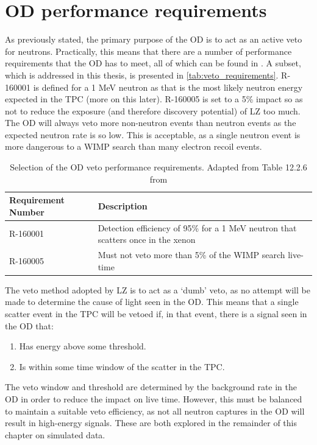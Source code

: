 \section{OD performance requirements}
\label{sec:simulated_od_requirements}
\par
As previously stated, the primary purpose of the OD is to act as an active veto for neutrons.
Practically, this means that there are a number of performance requirements that the OD has to meet, all of which can be found in \cite{LZ_TechnicalDesignReview_ref}.
A subset, which is addressed in this thesis, is presented in \autoref{tab:veto_requirements}.
R-160001 is defined for a 1 MeV neutron as that is the most likely neutron energy expected in the TPC (more on this later).
R-160005 is set to a 5\% impact so as not to reduce the exposure (and therefore discovery potential) of LZ too much.
The OD will always veto more non-neutron events than neutron events as the expected neutron rate is so low.
This is acceptable, as a single neutron event is more dangerous to a WIMP search than many electron recoil events.
\begin{table}[]
    \centering
    \begin{tabular}{p{}p{}} %
    \hline
    {Requirement Number} & {Description} \\ \hline
    R-160001             & Detection efficiency of 95\% for a 1 MeV neutron that scatters once in the xenon \\
    R-160005             & Must not veto more than 5\% of the WIMP search live-time
    \end{tabular}
    \caption{Selection of the OD veto performance requirements. Adapted from Table 12.2.6 from \cite{LZ_TechnicalDesignReview_ref}}
    \label{tab:veto_requirements}
\end{table} 

\par
The veto method adopted by LZ is to act as a `dumb' veto, as no attempt will be made to determine the cause of light seen in the OD.
This means that a single scatter event in the TPC will be vetoed if, in that event, there is a signal seen in the OD that:
\begin{enumerate}
    \item Has energy above some threshold.
    \item Is within some time window of the scatter in the TPC. 
\end{enumerate}
The veto window and threshold are determined by the background rate in the OD in order to reduce the impact on live time.
However, this must be balanced to maintain a suitable veto efficiency, as not all neutron captures in the OD will result in high-energy signals.
These are both explored in the remainder of this chapter on simulated data.

